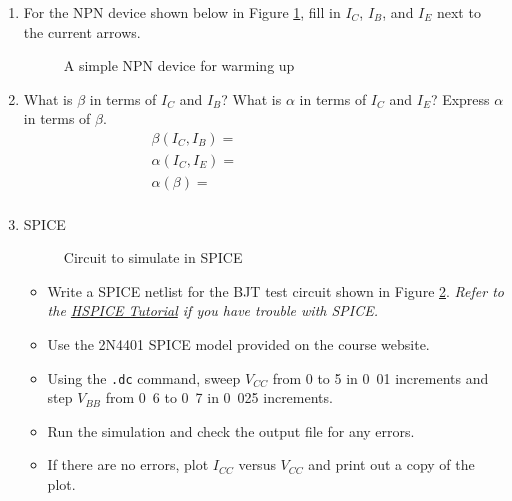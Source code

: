 \documentclass{article}
\begin{document}
\thispagestyle{plain}

\name

\begin{enumerate}
\item
  For the NPN device shown below in Figure \ref{prelab1}, fill in $I_C$, $I_B$, and $I_E$ next to the current arrows.
  
  \begin{figure}[!htb]
    
    \centerline{\box\graph}
    \caption{A simple NPN device for warming up}
    \label{prelab1}
  \end{figure}
    
\item What is $\beta$ in terms of $I_C$ and $I_B$? What is $\alpha$ in terms of $I_C$ and $I_E$? Express $\alpha$ in terms of $\beta$.
  \begin{align*}
    \boxed{\beta\left(I_C, I_B\right) = \frac{}{}~~~~~~~~~~~~~~~~~~~~~~~~~~~~~~~~~~~~~~~~~~~~} \\
    \boxed{\alpha\left(I_C, I_E\right) = \frac{}{}~~~~~~~~~~~~~~~~~~~~~~~~~~~~~~~~~~~~~~~~~~~~} \\
    \boxed{\alpha\left(\beta\right) = \frac{}{}~~~~~~~~~~~~~~~~~~~~~~~~~~~~~~~~~~~~~~~~~~~~} \\
  \end{align*}
\item
  SPICE

  \begin{figure}[!htb]
    
    \centerline{\box\graph}
    \caption{Circuit to simulate in SPICE}
    \label{prelab2}
  \end{figure}

  \begin{itemize}
  \item Write a SPICE netlist for the BJT test circuit shown in Figure \ref{prelab2}. \textit{Refer to the \href{\baseurl/tutorials/HSPICE_Tutorial.pdf}{HSPICE Tutorial} if you have trouble with SPICE.}    
  \item Use the 2N4401 SPICE model provided on the course website.
  \item Using the \verb|.dc| command, sweep $V_{CC}$ from \unit{0}{\volt} to \unit{5}{\volt} in \unit{0.01}{\volt} increments and step $V_{BB}$ from \unit{0.6}{\volt} to \unit{0.7}{\volt} in \unit{0.025}{\volt} increments.
  \item Run the simulation and check the output file for any errors.  
  \item If there are no errors, plot $I_{CC}$ versus $V_{CC}$ and print out a copy of the plot. 
  \end{itemize}
  

\end{enumerate}
\end{document}
